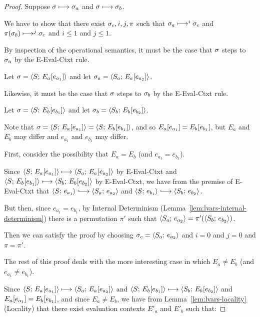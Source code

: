 \begin{proof}
  Suppose $\sigma \longmapsto \sigma_a$ and $\sigma \longmapsto \sigma_b$.

  We have to show that there exist $\sigma_c, i, j, \pi$ such that
  $\sigma_a \longmapsto^i \sigma_c$ and $\pi(\sigma_b) \longmapsto^j
  \sigma_c$ and $i \leq 1$ and $j \leq 1$.

  By inspection of the operational semantics, it must be the case that
  $\sigma$ steps to $\sigma_a$ by the {\sc E-Eval-Ctxt} rule.

  Let $\sigma = \langle S;\, E_a\hspace{-0.5mm}\left[e_{a_1}\right] \rangle$ and let $\sigma_a =
  \langle S_a;\, E_a\hspace{-0.5mm}\left[e_{a_2}\right] \rangle$.

  Likewise, it must be the case that $\sigma$ steps to $\sigma_b$ by the
  {\sc E-Eval-Ctxt} rule.

  Let $\sigma = \langle S;\, E_b\hspace{-0.5mm}\left[e_{b_1}\right] \rangle$ and let $\sigma_b =
  \langle S_b;\, E_b\hspace{-0.5mm}\left[e_{b_2}\right] \rangle$.

  Note that $\sigma = \langle S;\, E_a\hspace{-0.5mm}\left[e_{a_1}\right] \rangle =
  \langle S;\, E_b\hspace{-0.5mm}\left[e_{b_1}\right] \rangle$, and so
  $E_a\hspace{-0.5mm}\left[e_{a_1}\right] = E_b\hspace{-0.5mm}\left[e_{b_1}\right]$, but $E_a$ and
  $E_b$ may differ and $e_{a_1}$ and $e_{b_1}$ may differ.

  First, consider the possibility that $E_a = E_b$ (and $e_{a_1} =
  e_{b_1}$).

  Since $\langle S;\, E_a\hspace{-0.5mm}\left[e_{a_1}\right] \rangle \longmapsto
  \langle S_a;\, E_a\hspace{-0.5mm}\left[e_{a_2}\right] \rangle$ by {\sc E-Eval-Ctxt} and
  $\langle S;\, E_b\hspace{-0.5mm}\left[e_{b_1}\right] \rangle \longmapsto
  \langle S_b;\, E_b\hspace{-0.5mm}\left[e_{b_2}\right] \rangle$ by {\sc E-Eval-Ctxt}, we have
  from the premise of {\sc E-Eval-Ctxt} that $\config{S}{e_{a_1}}
  \parstepsto \config{S_a}{e_{a_2}}$ and $\config{S}{e_{b_1}}
  \parstepsto \config{S_b}{e_{b_2}}$.

  But then, since $e_{a_1} = e_{b_1}$, by Internal Determinism
  (Lemma~\ref{lem:lvars-internal-determinism}) there is a permutation
  $\pi'$ such that $\langle S_a;\, e_{a_2} \rangle =
  \pi'(\langle S_b;\, e_{b_2} \rangle)$.

  Then we can satisfy the proof by choosing $\sigma_c =
  \langle S_a;\, e_{a_2} \rangle$ and $i = 0$ and $j = 0$ and $\pi = \pi'$.

  The rest of this proof deals with the more interesting case in which
  $E_a \neq E_b$ (and $e_{a_1} \neq e_{b_1}$).

  Since $\langle S;\, E_a\hspace{-0.5mm}\left[e_{a_1}\right] \rangle \longmapsto
  \langle S_a;\, E_a\hspace{-0.5mm}\left[e_{a_2}\right] \rangle$ and
  $\langle S;\, E_b\hspace{-0.5mm}\left[e_{b_1}\right] \rangle \longmapsto
  \langle S_b;\, E_b\hspace{-0.5mm}\left[e_{b_2}\right] \rangle$ and $E_a\hspace{-0.5mm}\left[e_{a_1}\right]
  = E_b\hspace{-0.5mm}\left[e_{b_1}\right]$, and since $E_a \neq E_b$, we have from
  Lemma~\ref{lem:lvars-locality} (Locality) that there exist
  evaluation contexts $E'_a$ and $E'_b$ such that:


\end{proof}
